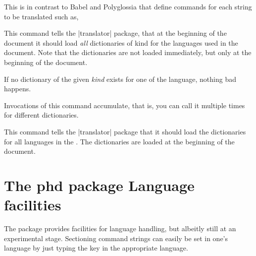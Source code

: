 This is in contrast to Babel and Polyglossia that define
commands for each string to be translated such as,

\begin{teXXX}
\def\captionsdutch{%
    \def\prefacename{Voorwoord}%
    \def\refname{Referenties}%
    \def\abstractname{Samenvatting}%
    \def\bibname{Bibliografie}%
    \def\chaptername{Hoofdstuk}%
    \def\appendixname{Bijlage}%
    \def\contentsname{Inhoudsopgave}%
    \def\listfigurename{Lijst van figuren}%
    \def\listtablename{Lijst van tabellen}%
    \def\indexname{Index}%
    \def\figurename{Figuur}%
    \def\tablename{Tabel}%
    \def\partname{Deel}%
    \def\enclname{Bijlage(n)}%
    \def\ccname{cc}%
    \def\headtoname{Aan}%
    \def\pagename{Pagina}%
    \def\seename{zie}%
    \def\alsoname{zie ook}%
    \def\proofname{Bewijs}%
    \def\glossaryname{Verklarende woordenlijst}%
    \def\today{\number\day~\ifcase\month%
      \or januari\or februari\or maart\or april\or mei\or juni\or
      juli\or augustus\or september\or oktober\or november\or
      december\fi
      \space \number\year}}
\end{teXXX}

\begin{macro}{\usedictionary}
  This command tells the |translator| package, that at the beginning of
  the document it should load \textit{all} dictionaries of kind  for
  the languages used in the document. Note that the dictionaries are
  not loaded immediately, but only at the beginning of the document.

  If no dictionary of the given \emph{kind} exists for one of the
  language, nothing bad happens.

  Invocations of this command accumulate, that is, you can call it
  multiple times for different dictionaries.
\end{macro}

\begin{command}{\uselanguage{}}
  This command tells the |translator| package that it should load the
  dictionaries for all languages in the . The
  dictionaries are loaded at the beginning of the document.
\end{command}

\section{The phd package Language facilities}

The  package provides facilities for language handling, but albeitly still at an experimental stage. Sectioning command strings can easily be set in one's language by just typing the key in the appropriate language.

